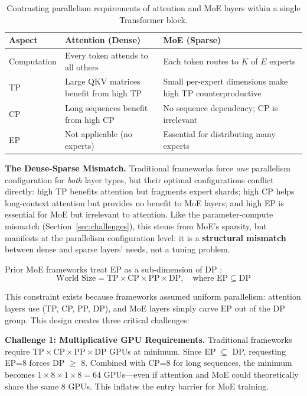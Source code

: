 \documentclass[10pt,logo,copyright]{nvidiatechreport}
\begin{document}
\begin{table}[ht]
\centering
\caption{Contrasting parallelism requirements of attention and MoE layers within a single Transformer block.}
\label{tab:dense-sparse-comparison}
\begin{tabular}{lp{}p{}}
\toprule
\textbf{Aspect} & \textbf{Attention (Dense)} & \textbf{MoE (Sparse)} \\
\midrule
Computation & Every token attends to all others & Each token routes to $K$ of $E$ experts \\
TP & Large QKV matrices benefit from high TP & Small per-expert dimensions make high TP counterproductive \\
CP & Long sequences benefit from high CP & No sequence dependency; CP is irrelevant \\
EP & Not applicable (no experts) & Essential for distributing many experts \\
\bottomrule
\end{tabular}
\end{table}

\textbf{The Dense-Sparse Mismatch.} Traditional frameworks force \emph{one} parallelism configuration for \emph{both} layer types, but their optimal configurations conflict directly: high TP benefits attention but fragments expert shards; high CP helps long-context attention but provides no benefit to MoE layers; and high EP is essential for MoE but irrelevant to attention. Like the parameter-compute mismatch (Section~\ref{sec:challenges}), this stems from MoE's sparsity, but manifests at the parallelism configuration level: it is a \textbf{structural mismatch} between dense and sparse layers' needs, not a tuning problem.

Prior MoE frameworks treat EP as a sub-dimension of DP \cite{lepikhin2020gshard,fedus2022switchtransformersscalingtrillion}:
\[
\text{World Size} = \text{TP} \times \text{CP} \times \text{PP} \times \text{DP}, \quad \text{where } \text{EP} \subseteq \text{DP}
\]

This constraint exists because frameworks assumed uniform parallelism: attention layers use (TP, CP, PP, DP), and MoE layers simply carve EP out of the DP group. This design creates three critical challenges:

\textbf{Challenge 1: Multiplicative GPU Requirements.} Traditional frameworks require $\text{TP} \times \text{CP} \times \text{PP} \times \text{DP}$ GPUs at minimum. Since EP $\subseteq$ DP, requesting EP=8 forces DP $\geq$ 8. Combined with CP=8 for long sequences, the minimum becomes $1 \times 8 \times 1 \times 8 = 64$ GPUs---even if attention and MoE could theoretically share the same 8 GPUs. This inflates the entry barrier for MoE training.
\end{document}
